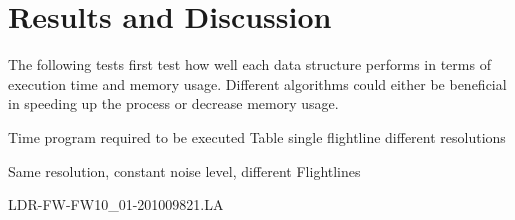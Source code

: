 \documentclass{subfiles}
\begin{document}
\section{Results and Discussion}

The following tests first test how well each data structure performs in terms of execution time and memory usage. 
Different algorithms could either be beneficial in speeding up the process or decrease memory usage. 


Time program required to be executed
Table single flightline different resolutions



Same resolution, constant noise level, different Flightlines



LDR-FW-FW10\_01-201009821.LA
\end{document}
